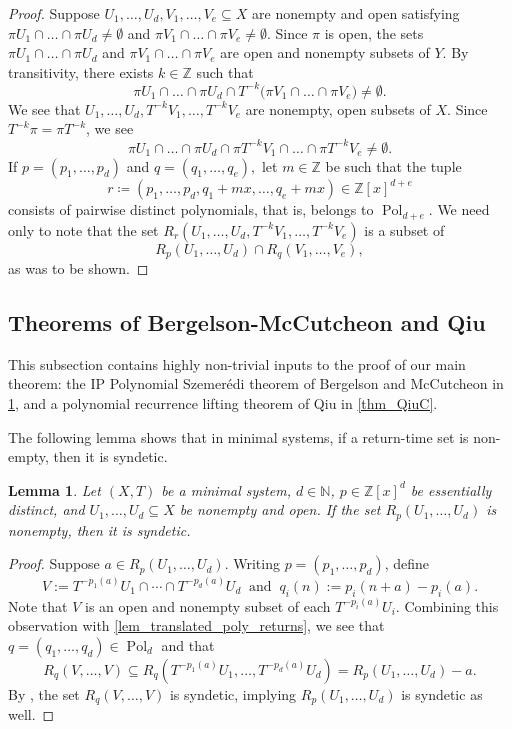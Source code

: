 \documentclass{article}
\theoremstyle{plain}
\newtheorem{lemma}[Theorem]{Lemma}
\theoremstyle{claim}
\theoremstyle{definition}
\theoremstyle{plain}
\theoremstyle{plain}
\newcommand{\Szemeredi}{Szemer\'{e}di}
\newcommand{\N}{\mathbb{N}}
\newcommand{\Z}{\mathbb{Z}}
\newcommand{\Pol}{\operatorname{Pol}}
\newcommand{\1}{\boldsymbol{1}}
\newcommand{\defeq}{\coloneqq}
\begin{document}
\begin{proof}
    Suppose $U_1,\ldots, U_d, V_1,\ldots, V_e \subseteq X$ are nonempty and open satisfying $\pi U_1\cap\ldots\cap \pi U_d \neq \emptyset$ and $\pi V_1\cap\ldots\cap \pi V_e \neq \emptyset$.  Since $\pi$ is open, the sets $\pi U_1\cap\ldots\cap \pi U_d$ and $\pi V_1\cap\ldots\cap \pi V_e$ are open and nonempty subsets of $Y$.  By transitivity, there exists $k \in \Z$ such that
    \[\pi U_1\cap\ldots\cap \pi U_d \cap T^{-k} \big(\pi V_1\cap\ldots\cap \pi V_e \big) \neq \emptyset.\]
    We see that $U_1, \ldots, U_d, T^{-k}V_1, \ldots, T^{-k}V_e$ are nonempty, open subsets of $X$.  Since $T^{-k} \pi = \pi T^{-k}$, we see
    \[\pi U_1\cap\ldots\cap \pi U_d \cap \pi T^{-k} V_1\cap\ldots\cap \pi T^{-k} V_e  \neq \emptyset.\]
    If $p=(p_1,\ldots,p_d)$ and $q=(q_1,\ldots,q_e),$ let $m \in \Z$ be such that the tuple
    \[r \defeq (p_1, \ldots, p_d, q_1 + mx, \ldots, q_e + mx) \in \Z[x]^{d+e}\]
    consists of pairwise distinct polynomials, that is, belongs to $\Pol_{d+e}$.
    We need only to note that the set $R_{r} (U_1,\ldots, U_d, T^{-k}V_1, \ldots, T^{-k}V_e)$ is a subset of
    \[
        R_p(U_1,\ldots,U_d) \cap R_q(V_1,\ldots,V_e),
    \]
    as was to be shown.
\end{proof}


\subsection{Theorems of Bergelson-McCutcheon and Qiu}
\label{subsec:bmq}

This subsection contains highly non-trivial inputs to the proof of our main theorem: the IP Polynomial \Szemeredi{} theorem of Bergelson and McCutcheon \cite[Lemma 6.12]{Bergelson_McCutcheon00} in \cref{lem_nonempty_implies_syndetic}, and a polynomial recurrence lifting theorem of Qiu \cite[Theorem~B]{Qiu23} in \cref{thm_QiuC}.

The following lemma shows that in minimal systems, if a return-time set is non-empty, then it is syndetic.

\begin{lemma}
\label{lem_nonempty_implies_syndetic}
    Let $(X,T)$ be a minimal system, $d \in \N$, $p \in \Z[x]^d$ be essentially distinct, and $U_1, \ldots, U_d \subseteq X$ be nonempty and open.  If the set $R_p(U_1, \ldots, U_d)$ is nonempty, then it is syndetic.
\end{lemma}

\begin{proof}
    Suppose $a \in R_p(U_1, \ldots, U_d)$.  Writing $p=(p_1,\ldots,p_d)$, define 
    \[V := T^{-p_1(a)} U_1 \cap \cdots \cap T^{-p_d(a)} U_d\;\;\text{and}\;\;q_i(n) := p_i(n+a) - p_i(a).\]  Note that $V$ is an open and nonempty subset of each $T^{-p_i(a)} U_i$. Combining this observation with \cref{lem_translated_poly_returns}, we see that $q = (q_1,\ldots,q_d) \in \Pol_d$ and that
    \[R_q(V,\ldots,V) \subseteq R_q(T^{-p_1(a)}U_1, \ldots, T^{-p_d(a)}U_d) = R_p(U_1,\ldots,U_d) - a.\]
    By \cite[Lemma 6.12]{Bergelson_McCutcheon00}, the set $R_q(V,\ldots,V)$ is syndetic, implying $R_p(U_1,\ldots,U_d)$ is syndetic as well.
\end{proof}
\end{document}
